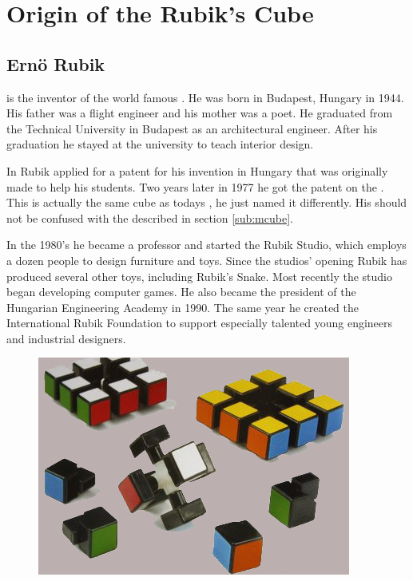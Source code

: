 \chapter{Origin of the Rubik's Cube}
\section{Ern\"{o} Rubik}
\erno{} is the inventor of the world famous \rubik{}. He was born in Budapest, Hungary in 1944. His father was a flight engineer and his mother was a poet. He graduated from the Technical University in Budapest as an architectural engineer. After his graduation he stayed at the university to teach interior design.

In  Rubik applied for a patent for his invention in Hungary that was originally made to help his students. Two years later in 1977 he got the patent on the \mcube{}. 
This \mcube{} is actually the same cube as todays \rubik{}, he just named it differently. 
His \mcube{} should not be confused with the \mcube{} described in section \ref{sub:mcube}.

In the 1980's he became a professor and started the Rubik Studio, which employs a dozen people to design furniture and toys. 
Since the studios' opening Rubik has produced several other toys, including Rubik's Snake. Most recently  the studio began developing computer games. 
He also became the president of the Hungarian Engineering Academy in 1990. The same year he created the International Rubik Foundation to support especially talented young engineers and industrial designers.

\begin{figure}
	\centering
		\includegraphics[scale=0.6]{input/pics/rubiks-cube.png}
	\caption{}
	\label{fig:rubiks-cube}
\end{figure}
 
